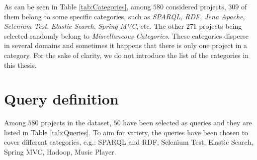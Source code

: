 As can be seen in Table \ref{tab:Categories}, among $580$ considered projects, $309$ of them belong to some specific categories, such as \emph{SPARQL, RDF, Jena Apache}, \emph{Selenium Test}, \emph{Elastic Search}, \emph{Spring MVC}, etc. The other $271$ projects being selected randomly belong to \emph{Miscellaneous Categories}. These categories disperse in several domains and sometimes it happens that there is only one project in a category. For the sake of clarity, we do not introduce the list of the categories in this thesis.




\section{Query definition} \label{sec:Queries}

Among $580$ projects in the dataset, $50$ have been selected as queries and they are listed in Table \ref{tab:Queries}. To aim for variety, the queries have been chosen to cover different categories, e.g.: SPARQL and RDF, Selenium Test, Elastic Search, Spring MVC, Hadoop, Music Player.

